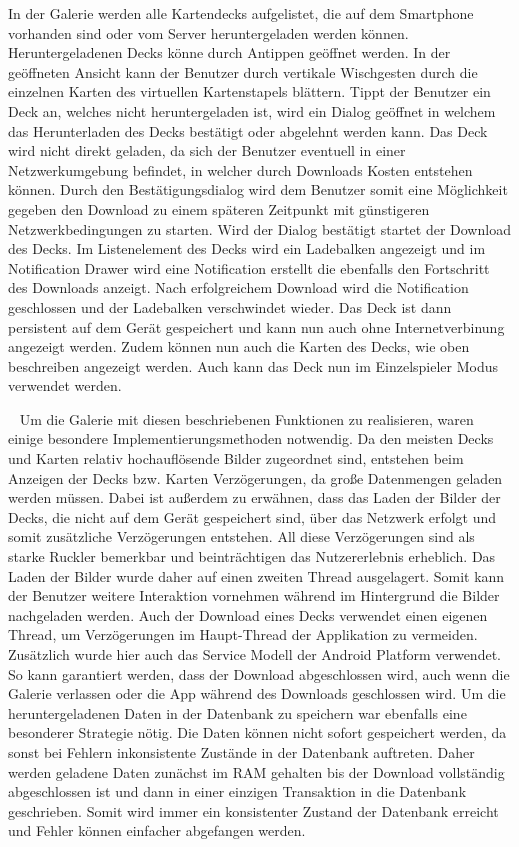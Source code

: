 \documentclass{scrartcl}
\begin{document}
In der Galerie werden alle Kartendecks aufgelistet, die auf dem Smartphone
vorhanden sind oder vom Server heruntergeladen werden können. Heruntergeladenen
Decks könne durch Antippen geöffnet werden. In der geöffneten Ansicht kann der
Benutzer durch vertikale Wischgesten durch die einzelnen Karten des virtuellen
Kartenstapels blättern. Tippt der Benutzer ein Deck an, welches nicht
heruntergeladen ist, wird ein Dialog geöffnet in welchem das Herunterladen des
Decks bestätigt oder abgelehnt werden kann. Das Deck wird nicht direkt geladen,
da sich der Benutzer eventuell in einer Netzwerkumgebung befindet, in welcher
durch Downloads Kosten entstehen können. Durch den Bestätigungsdialog wird dem
Benutzer somit eine Möglichkeit gegeben den Download zu einem späteren Zeitpunkt
mit günstigeren Netzwerkbedingungen zu starten. Wird der Dialog bestätigt startet
der Download des Decks. Im Listenelement des Decks wird ein Ladebalken angezeigt
und im Notification Drawer wird eine Notification erstellt die ebenfalls den
Fortschritt des Downloads anzeigt. Nach erfolgreichem Download wird die
Notification geschlossen und der Ladebalken verschwindet wieder. Das Deck ist
dann persistent auf dem Gerät gespeichert und kann nun auch ohne
Internetverbinung angezeigt werden. Zudem können nun auch die Karten des Decks,
wie oben beschreiben angezeigt werden. Auch kann das Deck nun im Einzelspieler
Modus verwendet werden.

\ \newline
Um die Galerie mit diesen beschriebenen Funktionen zu realisieren, waren einige
besondere Implementierungsmethoden notwendig. Da den meisten Decks und Karten
relativ hochauflösende Bilder zugeordnet sind, entstehen beim Anzeigen der Decks
bzw. Karten Verzögerungen, da große Datenmengen geladen werden müssen. Dabei ist
außerdem zu erwähnen, dass das Laden der Bilder der Decks, die nicht auf dem
Gerät gespeichert sind, über das Netzwerk erfolgt und somit zusätzliche
Verzögerungen entstehen. All diese Verzögerungen sind als starke Ruckler
bemerkbar und beinträchtigen das Nutzererlebnis erheblich. Das Laden der Bilder
wurde daher auf einen zweiten Thread ausgelagert. Somit kann der Benutzer
weitere Interaktion vornehmen während im Hintergrund die Bilder nachgeladen
werden. Auch der Download eines Decks verwendet einen eigenen Thread, um
Verzögerungen im Haupt-Thread der Applikation zu vermeiden. Zusätzlich wurde
hier auch das Service Modell der Android Platform verwendet. So kann garantiert
werden, dass der Download abgeschlossen wird, auch wenn die Galerie verlassen
oder die App während des Downloads geschlossen wird. Um die heruntergeladenen
Daten in der Datenbank zu speichern war ebenfalls eine besonderer Strategie
nötig. Die Daten können nicht sofort gespeichert werden, da sonst bei Fehlern
inkonsistente Zustände in der Datenbank auftreten. Daher werden geladene Daten
zunächst im RAM gehalten bis der Download vollständig abgeschlossen ist und dann
in einer einzigen Transaktion in die Datenbank geschrieben. Somit wird immer ein
konsistenter Zustand der Datenbank erreicht und Fehler können einfacher
abgefangen werden.
\end{document}
